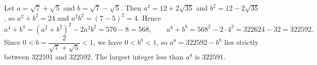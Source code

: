 Let $a=\sqrt7+\sqrt5$ and $b=\sqrt7-\sqrt5$. Then $a^2=12+2\sqrt{35}$ and $b^2=12-2\sqrt{35}$, so $a^2+b^2=24$ and $a^2b^2=(7-5)^2=4$. Hence
\[a^4+b^4=\left(a^2+b^2\right)^2-2a^2b^2=576-8=568,\qquad a^8+b^8=568^2-2\cdot4^2=322624-32=322592 .\]
Since $0<b=\dfrac{2}{\sqrt7+\sqrt5}<1$, we have $0<b^8<1$, so $a^8=322592-b^8$ lies strictly between $322591$ and $322592$. The largest integer less than $a^8$ is $\boxed{322591}$.
